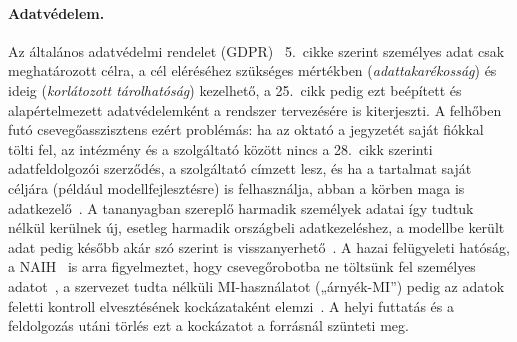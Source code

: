 \paragraph{Adatvédelem.} Az általános adatvédelmi rendelet (GDPR)~\cite{gdpr2016} 5.~cikke szerint
személyes adat csak meghatározott célra, a cél eléréséhez szükséges mértékben (\emph{adattakarékosság}) és
ideig (\emph{korlátozott tárolhatóság}) kezelhető, a 25.~cikk pedig ezt beépített és alapértelmezett
adatvédelemként a rendszer tervezésére is kiterjeszti. A felhőben futó csevegőasszisztens ezért
problémás: ha az oktató a jegyzetét saját fiókkal tölti fel, az intézmény és a szolgáltató között nincs a
28.~cikk szerinti adatfeldolgozói szerződés, a szolgáltató címzett lesz, és ha a tartalmat saját céljára
(például modellfejlesztésre) is felhasználja, abban a körben maga is adatkezelő~\cite{edpb2021controller}.
A tananyagban szereplő harmadik személyek adatai így tudtuk nélkül kerülnek új, esetleg harmadik országbeli
adatkezeléshez, a modellbe került adat pedig később akár szó szerint is
visszanyerhető~\cite{carlini2021extracting}. A hazai felügyeleti hatóság, a NAIH~\cite{infotv2011} is arra
figyelmeztet, hogy csevegőrobotba ne töltsünk fel személyes adatot~\cite{naihfigyelem}, a szervezet tudta
nélküli MI-használatot („árnyék-MI”) pedig az adatok feletti kontroll elvesztésének kockázataként
elemzi~\cite{naih2025bankok}. A helyi futtatás és a feldolgozás utáni törlés ezt a kockázatot a forrásnál
szünteti meg.

